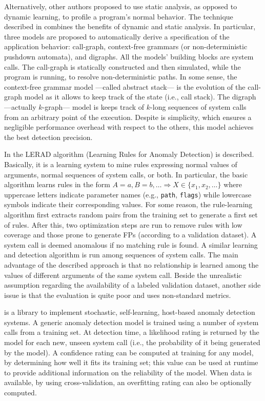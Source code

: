Alternatively, other authors proposed to use static analysis, as
opposed to dynamic learning, to profile a program's normal
behavior. The technique described in
\citep{wagner:sp2001:staticanalysis} combines the benefits of dynamic
and static analysis. In particular, three models are proposed to
automatically derive a specification of the application behavior:
call-graph, context-free grammars (or non-deterministic pushdown
automata), and digraphs. All the models' building blocks are system
calls. The call-graph is statically constructed and then simulated,
while the program is running, to resolve non-deterministic paths. In
some sense, the context-free grammar model ---called abstract stack---
is the evolution of the call-graph model as it allows to keep track of
the state (i.e., call stack). The digraph ---actually $k$-graph---
model is keeps track of $k$-long sequences of system calls from an
arbitrary point of the execution. Despite is simplicity, which ensures
a negligible performance overhead with respect to the others, this
model achieves the best detection precision.

In \citep{rulessystemcallarguments} the \ac{LERAD}
algorithm (Learning Rules for Anomaly Detection) is
described. Basically, it is a learning system to mine rules expressing
normal values of arguments, normal sequences of system calls, or
both. In particular, the basic algorithm learns rules in the form $A =
a, B = b, \dots \Rightarrow X \in \{x_{1}, x_{2}, \dots\}$ where
uppercase letters indicate parameter names (e.g., \texttt{path},
\texttt{flags}) while lowercase symbols indicate their corresponding
values. For some reason, the rule-learning algorithm first extracts
random pairs from the training set to generate a first set of
rules. After this, two optimization steps are run to remove rules with
low coverage and those prone to generate \acp{FP} (according
to a validation dataset). A system call is deemed anomalous if no
matching rule is found. A similar learning and detection algorithm is
run among sequences of system calls. The main advantage of the
described approach is that no relationship is learned among the values
of different arguments of the same system call. Beside the unrealistic
assumption regarding the availability of a labeled validation dataset,
another side issue is that the evaluation is quite poor and uses
non-standard metrics.

\LibAnomaly \citep{libanomaly} is a library to implement stochastic,
self-learning, host-based anomaly detection systems. A generic anomaly
detection model is trained using a number of system calls from a
training set. At detection time, a likelihood rating is returned by
the model for each new, unseen system call (i.e., the probability of
it being generated by the model). A confidence rating can be computed
at training for any model, by determining how well it fits its
training set; this value can be used at runtime to provide additional
information on the reliability of the model. When data is available,
by using cross-validation, an overfitting rating can also be
optionally computed.

